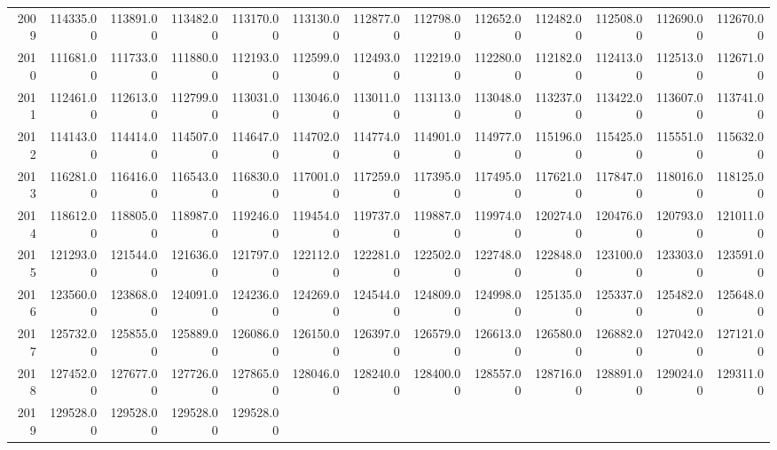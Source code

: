 \begin{longtable}{rrrrrrrrrrrrr}
  2009 & 114335.00 & 113891.00 & 113482.00 & 113170.00 & 113130.00 & 112877.00 & 112798.00 & 112652.00 & 112482.00 & 112508.00 & 112690.00 & 112670.00 \\ 
  2010 & 111681.00 & 111733.00 & 111880.00 & 112193.00 & 112599.00 & 112493.00 & 112219.00 & 112280.00 & 112182.00 & 112413.00 & 112513.00 & 112671.00 \\ 
  2011 & 112461.00 & 112613.00 & 112799.00 & 113031.00 & 113046.00 & 113011.00 & 113113.00 & 113048.00 & 113237.00 & 113422.00 & 113607.00 & 113741.00 \\ 
  2012 & 114143.00 & 114414.00 & 114507.00 & 114647.00 & 114702.00 & 114774.00 & 114901.00 & 114977.00 & 115196.00 & 115425.00 & 115551.00 & 115632.00 \\ 
  2013 & 116281.00 & 116416.00 & 116543.00 & 116830.00 & 117001.00 & 117259.00 & 117395.00 & 117495.00 & 117621.00 & 117847.00 & 118016.00 & 118125.00 \\ 
  2014 & 118612.00 & 118805.00 & 118987.00 & 119246.00 & 119454.00 & 119737.00 & 119887.00 & 119974.00 & 120274.00 & 120476.00 & 120793.00 & 121011.00 \\ 
  2015 & 121293.00 & 121544.00 & 121636.00 & 121797.00 & 122112.00 & 122281.00 & 122502.00 & 122748.00 & 122848.00 & 123100.00 & 123303.00 & 123591.00 \\ 
  2016 & 123560.00 & 123868.00 & 124091.00 & 124236.00 & 124269.00 & 124544.00 & 124809.00 & 124998.00 & 125135.00 & 125337.00 & 125482.00 & 125648.00 \\ 
  2017 & 125732.00 & 125855.00 & 125889.00 & 126086.00 & 126150.00 & 126397.00 & 126579.00 & 126613.00 & 126580.00 & 126882.00 & 127042.00 & 127121.00 \\ 
  2018 & 127452.00 & 127677.00 & 127726.00 & 127865.00 & 128046.00 & 128240.00 & 128400.00 & 128557.00 & 128716.00 & 128891.00 & 129024.00 & 129311.00 \\ 
  2019 & 129528.00 & 129528.00 & 129528.00 & 129528.00 &  &  &  &  &  &  &  &  \\ 
   \hline
\hline
\end{longtable}
